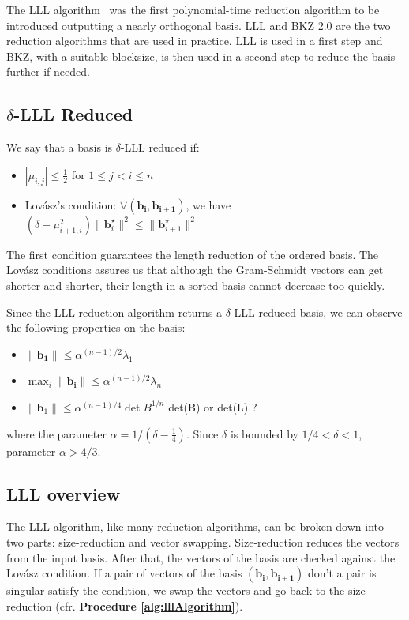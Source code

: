 \documentclass[10pt, a4paper]{article}
\newcommand{\my}[1]{{\color{blue} #1 }}
\renewcommand{\vec}[1]{\mathbf{#1}}
\begin{document}
The LLL algorithm~\cite{lllpaper} was the first polynomial-time reduction algorithm to be introduced outputting a nearly orthogonal basis. LLL and BKZ 2.0 are the two reduction algorithms that are used in practice. LLL is used in a first step and BKZ, with a suitable blocksize, is then used in a second step to reduce the basis further if needed.

\subsection{$\delta$-LLL Reduced}
We say that a basis is $\delta$-LLL reduced if:
\begin{itemize}
\item $| \mu_{i,j}| \leq \frac{1}{2} $ for $1 \leq j < i \leq n$
\item Lovász's condition: $\forall (\vec{b_i, b_{i+1}})$, we have $(\delta - \mu^2_{i+1,i}) \|\vec{b}^{\star}_{i}\|^2 \leq \| \vec{b}^{\star}_{i+1} \|^2$
\end{itemize}

The first condition guarantees the length reduction of the ordered basis.
The Lovász conditions assures us that although the Gram-Schmidt vectors can get shorter and shorter, their length in a sorted basis cannot decrease too quickly.

Since the LLL-reduction algorithm returns a $\delta$-LLL reduced basis, we can observe the following properties on the basis:
\begin{itemize}
\item $\| \vec{b_1} \| \leq \alpha^{(n-1)/2} \lambda_1 $
\item $\max_i \| \vec{b_i} \| \leq \alpha^{(n-1)/2} \lambda_n $
\item $\| \vec{b}_1 \| \leq \alpha^{(n-1)/4} \det B^{1/n}$ \my{det(B) or det(L) ?  }
\end{itemize} 
where the parameter $\alpha = 1/(\delta - \frac{1}{4})$. Since $\delta$ is bounded by $1/4 < \delta < 1$, parameter $\alpha > 4/3$.

\subsection{LLL overview}

The LLL algorithm, like many reduction algorithms, can be broken down into two parts: size-reduction and vector swapping. Size-reduction reduces the vectors from the input basis. After that, the vectors of the basis are checked against the Lovász condition. If a pair of vectors of the basis $(\vec{b_{i}}, \vec{b_{i+1}})$ don't \my{a pair is singular} satisfy the condition, we swap \my{the vectors} and go back to the size reduction (cfr. \textbf{Procedure \ref{alg:lllAlgorithm}}).
\end{document}
